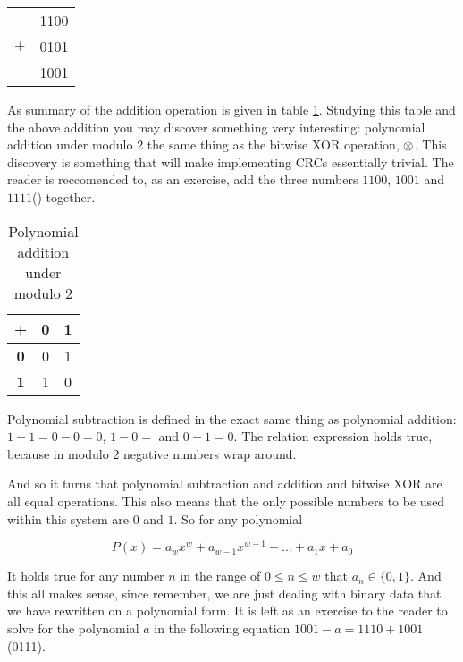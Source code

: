 \begin{center}
  \begin{tabular}{lr}
    & 1100  \\
    $+$ & 0101 \\
    \hline
    & 1001 \\
  \end{tabular}
\end{center}

As summary of the addition operation is given in table
\ref{tab:poly-add}. Studying this table and the above addition you may
discover something very interesting: polynomial addition under modulo
2 the same thing as the bitwise XOR operation, $\mathrel{\otimes}$. This
discovery is something that will make implementing CRCs essentially
trivial. The reader is reccomended to, as an exercise, add the three
numbers $1100$, $1001$ and $1111$() together.

\begin{table}
  \centering
  \begin{tabular}{|c|c|c|}
    \hline
    \textbf{+} & \textbf{0} & \textbf{1} \\ \hline
    \textbf{0} & 0 & 1 \\ \hline
    \textbf{1} & 1 & 0 \\ \hline
  \end{tabular}
  \caption{Polynomial addition under modulo 2}
  \label{tab:poly-add}
\end{table}

Polynomial subtraction is defined in the exact same thing as
polynomial addition: $1 - 1 = 0 - 0 = 0$, $1 - 0 = $ and $0 - 1 =
0$. The relation expression holds true, because in modulo 2 negative
numbers wrap around.

And so it turns that polynomial subtraction and addition and bitwise
XOR are all equal operations. This also means that the only possible
numbers to be used within this system are $0$ and $1$. So for any
polynomial

\begin{equation*}
  P(x) = a_wx^w + a_{w-1}x^{w-1} + \dots + a_{1}x + a_{0}
\end{equation*}

It holds true for any number $n$ in the range of $0 \le n \le w$ that
$a_n \in \{0,1\}$. And this all makes sense, since remember, we are
just dealing with binary data that we have rewritten on a polynomial
form. It is left as an exercise to the reader to solve for the
polynomial $a$ in the following equation $1001 - a = 1110 +
1001$(0111).

